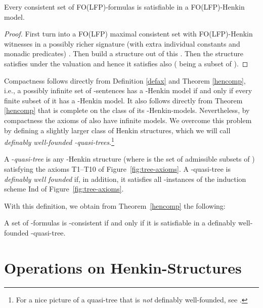 \documentclass{LMCS}
\newcommand{\folfp}{\textsf{FO(LFP)}\xspace}
\begin{document}
\begin{thm}
Every consistent set  of \folfp-formulas is satisfiable in a \folfp-Henkin model.\label{folfpcomp}
\end{thm}

\begin{proof}
First turn  into a \folfp maximal consistent set  with \folfp-Henkin witnesses in a possibly richer signature (with extra
individual constants and monadic predicates) . Then build a structure  out of this . Then the structure
 satisfies  under the valuation  and hence it satisfies also  ( being a subset of ).
\end{proof}

Compactness follows directly from Definition \ref{defax} and Theorem
\ref{hencomp}, i.e., a possibly infinite set of -sentences
has a -Henkin model if and only if every finite subset of it
has a -Henkin model. It also follows directly from Theorem
\ref{hencomp} that  is complete on the class of
its -Henkin-models. Nevertheless, by compactness the axioms
of  also have infinite models. We overcome this problem by defining a slightly larger class of Henkin structures, which we will call \emph{definably well-founded -quasi-trees}.\footnote{For a nice picture of a quasi-tree that is \emph{not} definably well-founded, see \cite{1995}.}
\begin{defi}
  A -\emph{quasi-tree} is any -Henkin structure 
  (where  is the set of admissible subsets of )
  satisfying the axioms T1--T10 of
  Figure~\ref{fig:tree-axioms}. A -quasi-tree is \emph{definably
    well founded} if, in addition, it satisfies all -instances of the
  induction scheme Ind of Figure~\ref{fig:tree-axioms}.
\end{defi}

With this definition, we obtain from Theorem~\ref{hencomp} the following:

\begin{cor}\label{henktreecomp}
A set of -formulas is -consistent if
and only if it is satisfiable in a definably well-founded -quasi-tree.
\end{cor}

\section{Operations on Henkin-Structures}
\label{sec4}
\end{document}
